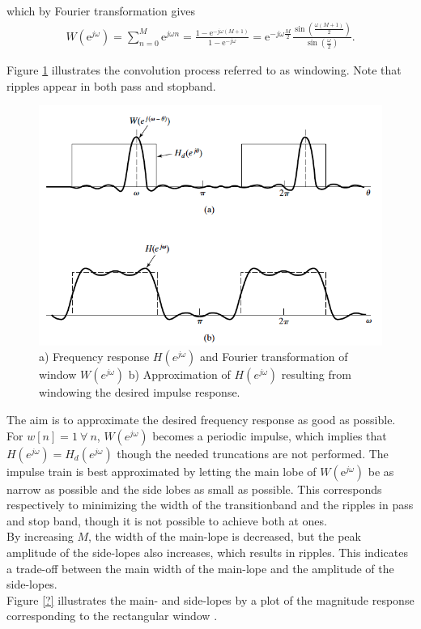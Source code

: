 which by Fourier transformation gives 
\begin{align}
W \left(\text{e}^{j\omega}\right)=\sum_{n=0}^{M} \text{e}^{j\omega n} = \frac{1- \text{e}^{-j\omega(M+1)}}{1- \text{e}^{-j\omega}} = \text{e}^{-j\omega \frac{M}{2}} \frac{ \sin \left( \frac{\omega \left( M+1 \right)}{2} \right)}{\sin \left( \frac{\omega}{2} \right)}.
\end{align}

Figure \ref{fig:FIR1} illustrates the convolution process referred to as windowing. Note that ripples appear in both pass and stopband.

\begin{figure}[H]
    \centering
    \includegraphics[scale=0.4]{figures/FIR1.png}
    \caption{a) Frequency response $H(e^{j\omega})$ and Fourier transformation of window $W(e^{j\omega})$ b) Approximation of $H(e^{j\omega})$ resulting from windowing the desired impulse response.}
    \label{fig:FIR1}
\end{figure}

The aim is to approximate the desired frequency response as good as possible. For $w[n]=1 \ \forall \ n$, $W(e^{j\omega})$ becomes a periodic impulse, which implies that $H(e^{j\omega}) = H_d(e^{j\omega})$ though the needed truncations are not performed. The impulse train is best approximated by letting the main lobe of $W(\text{e}^{j\omega})$ be as narrow as possible and the side lobes as small as possible. This corresponds respectively to minimizing the width of the transitionband and the ripples in pass and stop band, though it is not possible to achieve both at ones.\\
By increasing $M$, the width of the main-lope is decreased, but the peak amplitude of the side-lopes also increases, which results in ripples. This indicates a trade-off between the main width of the main-lope and the amplitude of the side-lopes. \\
Figure \ref{?} illustrates the main- and side-lopes by a plot of the magnitude response corresponding to the rectangular window .


